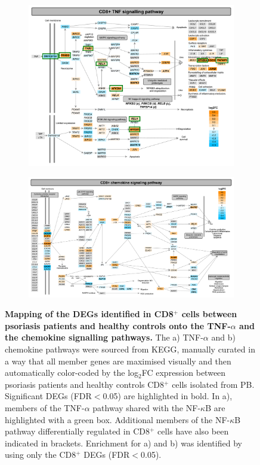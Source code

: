 \begin{figure}[htbp]
\centering
\begin{subfigure}{0.8\textwidth}
\centering
\includegraphics[width=\textwidth]{./Results2/pdfs/PS_CTL_CD8_all_TNF_pathway}
\caption{\textbf{}}
\end{subfigure}
\begin{subfigure}{0.8 \textwidth}
\centering
\includegraphics[width=\textwidth]{./Results2/pdfs/PS_CTL_CD8_all_chemokine_pathway}
\caption{\textbf{}}
\end{subfigure}
\caption[Mapping of the DEGs identified in CD8$^+$ cells between psoriasis patients and healthy controls onto the TNF-$\alpha$ and the chemokine signalling pathways.]{\textbf{Mapping of the DEGs identified in CD8$^+$ cells between psoriasis patients and healthy controls onto the TNF-$\alpha$ and the chemokine signalling pathways.} The a) TNF-$\alpha$ and b) chemokine pathways were sourced from KEGG, manually curated in a way that all member genes are maximised visually and then automatically color-coded by the log$_2$FC expression between psoriasis patients and healthy controls CD8$^+$ cells isolated from PB. Significant DEGs (FDR$<$0.05) are highlighted in bold. In a), members of the TNF-$\alpha$ pathway shared with the NF-$\kappa$B are highlighted with a green box. Additional members of the NF-$\kappa$B pathway differentially regulated in CD8$^+$ cells have also been indicated in brackets. Enrichment for a) and b) was identified by using only the CD8$^+$ DEGs (FDR$<$0.05).}

\end{figure}
